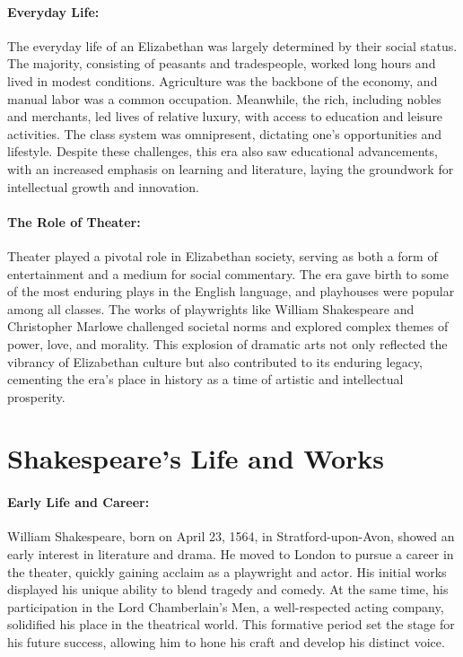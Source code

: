 \documentclass[a4paper,12pt]{book}
\begin{document}
\paragraph{Everyday Life:}
The everyday life of an Elizabethan was largely determined by their social status. The majority, consisting of peasants and tradespeople, worked long hours and lived in modest conditions. Agriculture was the backbone of the economy, and manual labor was a common occupation. Meanwhile, the rich, including nobles and merchants, led lives of relative luxury, with access to education and leisure activities. The class system was omnipresent, dictating one’s opportunities and lifestyle. Despite these challenges, this era also saw educational advancements, with an increased emphasis on learning and literature, laying the groundwork for intellectual growth and innovation.

\paragraph{The Role of Theater:}
Theater played a pivotal role in Elizabethan society, serving as both a form of entertainment and a medium for social commentary. The era gave birth to some of the most enduring plays in the English language, and playhouses were popular among all classes. The works of playwrights like William Shakespeare and Christopher Marlowe challenged societal norms and explored complex themes of power, love, and morality. This explosion of dramatic arts not only reflected the vibrancy of Elizabethan culture but also contributed to its enduring legacy, cementing the era’s place in history as a time of artistic and intellectual prosperity.

\section*{Shakespeare’s Life and Works}

\paragraph{Early Life and Career:}
William Shakespeare, born on April 23, 1564, in Stratford-upon-Avon, showed an early interest in literature and drama. He moved to London to pursue a career in the theater, quickly gaining acclaim as a playwright and actor. His initial works displayed his unique ability to blend tragedy and comedy. At the same time, his participation in the Lord Chamberlain's Men, a well-respected acting company, solidified his place in the theatrical world. This formative period set the stage for his future success, allowing him to hone his craft and develop his distinct voice.
\end{document}
